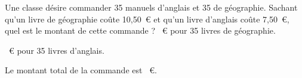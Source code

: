 Une classe désire commander 35 manuels d'anglais et 35 de
géographie. Sachant qu'un livre de géographie coûte
10,50~\textgreek{\euro} et qu'un livre d'anglais coûte
7,50~\textgreek{\euro}, quel est le montant de cette commande ?
~\textgreek{\euro}
pour 35 livres de géographie.
\par{}~\textgreek{\euro}
pour 35 livres d'anglais.
\par Le montant total de la commande est
~\textgreek{\euro}.